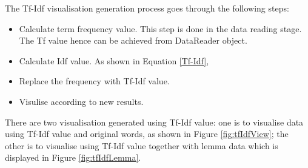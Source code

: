 The Tf-Idf visualisation generation process goes through the following steps:

\begin{itemize}
\item \textbf{} Calculate term frequency value. This step is done in the data reading stage. The Tf value hence can be achieved from DataReader object.
\item \textbf{} Calculate Idf value. As shown in Equation \ref{Tf-Idf},
\item \textbf{} Replace the frequency with Tf-Idf value.
\item \textbf{} Visulise according to new results.
\end{itemize} 

There are two visualisation generated using Tf-Idf value: one is to visualise data using Tf-Idf value and original words, as shown in Figure \ref{fig:tfIdfView}; the other is to visualise using Tf-Idf value together with lemma data which is displayed in Figure \ref{fig:tfIdfLemma}.



